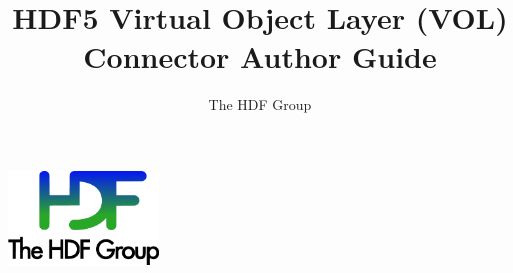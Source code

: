 \documentclass[10pt,a4paper]{article}
\title{HDF5 Virtual Object Layer (VOL)\\
    Connector Author Guide}
\author{The HDF Group}
\begin{document}
\maketitle
\thispagestyle{empty}

\vfill
\begin{center}
\includegraphics[width=4cm]{THG_LOGO.pdf} %
\end{center}
\vfill
\vfill

\newpage
{}
\tableofcontents
\newpage


\renewcommand\appendixtocname{Appendix}


\newpage







\end{document}
